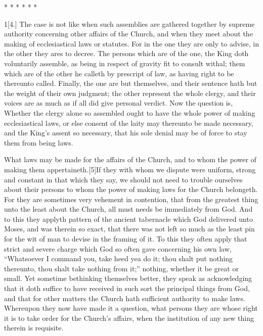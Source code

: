* * * * * *

1[4.] The case is not like when such assemblies are  gathered together by supreme authority concerning other affairs of the Church, and when they meet about the making of ecclesiastical laws or statutes. For in the one they are only to advise, in the other they ares to decree. The persons which are of the one, the King doth voluntarily assemble, as being in respect of gravity fit to consult withal; them which are of the other he calleth by prescript of law, as having right to be thereunto called. Finally, the one are but themselves, and their sentence hath but the weight of their own judgment; the other represent the whole clergy, and their voices are as much as if all did give personal verdict. Now the question is, Whether the clergy alone so assembled ought to have the whole power of making ecclesiastical laws, or else consent of the laity may thereunto be made necessary, and the King’s assent so necessary, that his sole denial may be of force to stay them from being laws.

What laws may be made for the affairs of the Church, and to whom the power of making them appertaineth.[5]If they with whom we dispute were uniform, strong and constant in that which they say, we should not need to trouble ourselves about their persons to whom the power of making laws for the Church belongeth. For they are sometimes very vehement in contention, that from the greatest thing unto the least about the Church, all must needs be immediately from God. And to this they applyth pattern of the ancient tabernacle which God delivered unto Moses, and was therein so exact, that there was not left so much as the least pin for the wit of man to devise in the framing of it.  To this they often apply that strict and severe charge which God so often gave concerning his own law, “Whatsoever I command you, take heed yea do it; thou shalt put nothing thereunto, thou shalt take nothing from it;” nothing, whether it be great or small. Yet sometime bethinking themselves better, they speak as acknowledging that it doth suffice to have received in such sort the principal things from God, and that for other matters the Church hath sufficient authority to make laws. Whereupon they now have made it a question, what persons they are whose right it is to take order for the Church’s affairs, when the institution of any new thing therein is requisite.

